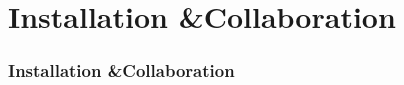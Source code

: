 
\section{Installation \&\;Collaboration}

\begin{frame}
    \frametitle{Installation \&\;Collaboration}
\end{frame}
